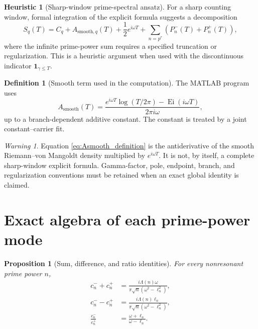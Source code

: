 \documentclass[11pt]{amsart}
\numberwithin{equation}{section}
\theoremstyle{plain}
\newtheorem{proposition}[theorem]{Proposition}
\theoremstyle{definition}
\newtheorem{definition}[theorem]{Definition}
\newtheorem{heuristic}[theorem]{Heuristic}
\theoremstyle{remark}
\newtheorem{warning}[theorem]{Warning}
\DeclareMathOperator{\Ei}{Ei}
\newcommand{\1}{\mathbf{1}}
\begin{document}
\begin{heuristic}[Sharp-window prime-spectral ansatz]
\label{heur:sharp_window_ansatz}
For a sharp counting window, formal integration of the explicit formula
suggests a decomposition
\begin{equation}
S_q(T)
=
C_q+
A_{\mathrm{smooth},q}(T)
+
\frac12e^{i\omega T}
+
\sum_{n=p^r} \left(P_n^-(T)+P_n^+(T)\right),
\label{eq:formal_sharp_decomposition}
\end{equation}
where the infinite prime-power sum requires a specified truncation or
regularization.  This is a heuristic argument when used with the
discontinuous indicator \(\1_{\gamma\leq T}\).
\end{heuristic}

\begin{definition}[Smooth term used in the computation]
\label{def:Asmooth}
The MATLAB program uses
\begin{equation}
A_{\mathrm{smooth}}(T)
=
\frac{
e^{i\omega T}\log(T/2\pi)-\Ei(i\omega T)
}{
2\pi i\omega
},
\label{eq:Asmooth_definition}
\end{equation}
up to a branch-dependent additive constant.  The constant is treated by
a joint constant--carrier fit.
\end{definition}

\begin{warning}
\label{warn:Asmooth_status}
Equation \eqref{eq:Asmooth_definition} is the antiderivative of the
smooth Riemann--von Mangoldt density multiplied by \(e^{i\omega T}\).
It is not, by itself, a complete sharp-window explicit formula.
Gamma-factor, pole, endpoint, branch, and regularization conventions must
be retained when an exact global identity is claimed.
\end{warning}

\section{Exact algebra of each prime-power mode}
\label{sec:mode_algebra}

\begin{proposition}[Sum, difference, and ratio identities]
\label{prop:coefficient_identities}
For every nonresonant prime power \(n\),
\begin{align}
c_n^-+c_n^+
&=
\frac{i\Lambda(n)\omega}
{\pi\sqrt n(\omega^2-\ell_n^2)},
\label{eq:coefficient_sum}
\\
c_n^--c_n^+
&=
\frac{i\Lambda(n)\ell_n}
{\pi\sqrt n(\omega^2-\ell_n^2)},
\label{eq:coefficient_difference}
\\
\frac{c_n^-}{c_n^+}
&=
\frac{\omega+\ell_n}{\omega-\ell_n}.
\label{eq:coefficient_ratio}
\end{align}
\end{proposition}
\end{document}
